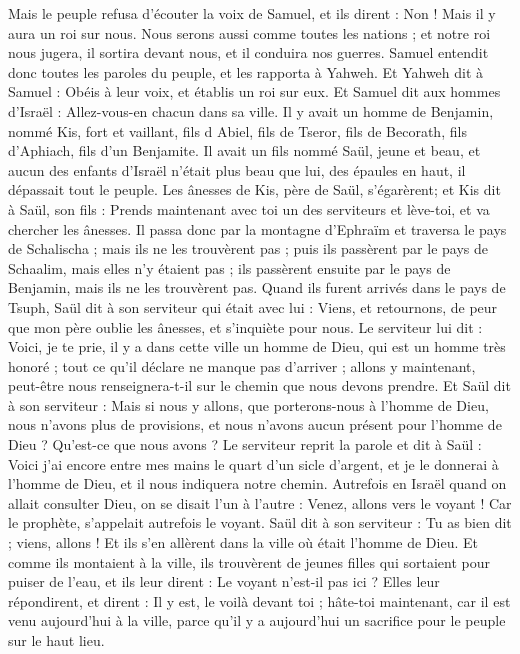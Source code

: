 \begin{multicols}{2}
Mais le peuple refusa d’écouter la voix de Samuel, et ils dirent : Non ! Mais il y aura un roi sur nous.
Nous serons aussi comme toutes les nations ; et notre roi nous jugera, il sortira devant nous, et il conduira nos guerres.
Samuel entendit donc toutes les paroles du peuple, et les rapporta à Yahweh.
Et Yahweh dit à Samuel : Obéis à leur voix, et établis un roi sur eux. Et Samuel dit aux hommes d'Israël : Allez-vous-en chacun dans sa ville.
\VerseOne{}Il y avait un homme de Benjamin, nommé Kis, fort et vaillant, fils d Abiel, fils de Tseror, fils de Becorath, fils d'Aphiach, fils d'un Benjamite.
Il avait un fils nommé Saül, jeune et beau, et aucun des enfants d'Israël n’était plus beau que lui, des épaules en haut, il dépassait tout le peuple.
Les ânesses de Kis, père de Saül, s’égarèrent; et Kis dit à Saül, son fils : Prends maintenant avec toi un des serviteurs et lève-toi, et va chercher les ânesses.
Il passa donc par la montagne d'Ephraïm et traversa le pays de Schalischa ; mais ils ne les trouvèrent pas ; puis ils passèrent par le pays de Schaalim, mais elles n'y étaient pas ; ils passèrent ensuite par le pays de Benjamin, mais ils ne les trouvèrent pas.
Quand ils furent arrivés dans le pays de Tsuph, Saül dit à son serviteur qui était avec lui : Viens, et retournons, de peur que mon père oublie les ânesses, et s’inquiète pour nous.
Le serviteur lui dit : Voici, je te prie, il y a dans cette ville un homme de Dieu, qui est un homme très honoré ; tout ce qu'il déclare ne manque pas d’arriver ; allons y maintenant, peut-être nous renseignera-t-il sur le chemin que nous devons prendre.
Et Saül dit à son serviteur : Mais si nous y allons, que porterons-nous à l'homme de Dieu, nous n’avons plus de provisions, et nous n'avons aucun présent pour l'homme de Dieu ? Qu’est-ce que nous avons ?
Le serviteur reprit la parole et dit à Saül : Voici j'ai encore entre mes mains le quart d'un sicle d'argent, et je le donnerai à l'homme de Dieu, et il nous indiquera notre chemin.
Autrefois en Israël quand on allait consulter Dieu, on se disait l'un à l'autre : Venez, allons vers le voyant ! Car le prophète, s'appelait autrefois le voyant.
Saül dit à son serviteur : Tu as bien dit ; viens, allons ! Et ils s'en allèrent dans la ville où était l'homme de Dieu.
Et comme ils montaient à la ville, ils trouvèrent de jeunes filles qui sortaient pour puiser de l'eau, et ils leur dirent : Le voyant n'est-il pas ici ?
Elles leur répondirent, et dirent : Il y est, le voilà devant toi ; hâte-toi maintenant, car il est venu aujourd'hui à la ville, parce qu'il y a aujourd'hui un sacrifice pour le peuple sur le haut lieu.

\end{multicols}
